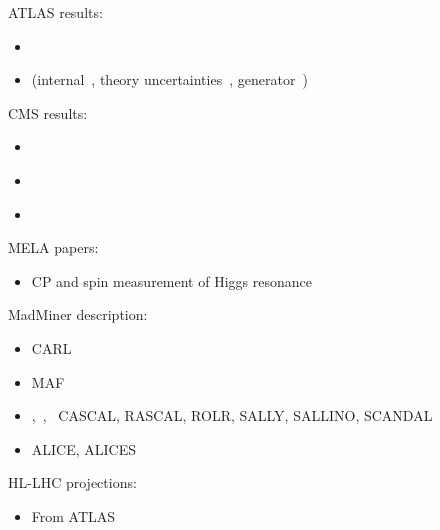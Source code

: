 \documentclass[11pt,letterpaper]{article}
\begin{document}
ATLAS results:
\begin{itemize}
  \item \cite{Aad:2015xua}
  \item \cite{Aaboud:2018puo} (internal~\cite{Abidi:2231604}, theory uncertainties~\cite{Meyer:2232040}, generator~\cite{ATL-PHYS-PUB-2017-005})
\end{itemize}

CMS results:
\begin{itemize}
  \item \cite{Khachatryan:2014iha}
  \item \cite{Khachatryan:2016ctc}
  \item \cite{Sirunyan:2019twz}
\end{itemize}

MELA papers:
\begin{itemize}
  \item \cite{Bolognesi:2012mm} CP and spin measurement of Higgs resonance
\end{itemize}

MadMiner description:
\begin{itemize}
  \item \cite{Cranmer:2015bka} CARL
  \item \cite{papamakarios2017masked} MAF
  \item \cite{Brehmer:2018kdj},~\cite{Brehmer:2018hga},~\cite{Brehmer:2018eca}  CASCAL, RASCAL, ROLR, SALLY, SALLINO, SCANDAL
  \item \cite{Stoye:2018ovl} ALICE, ALICES
\end{itemize}

HL-LHC projections:
\begin{itemize}
  \item \cite{ATL-PHYS-PUB-2015-024} From ATLAS
\end{itemize}



\end{document}
